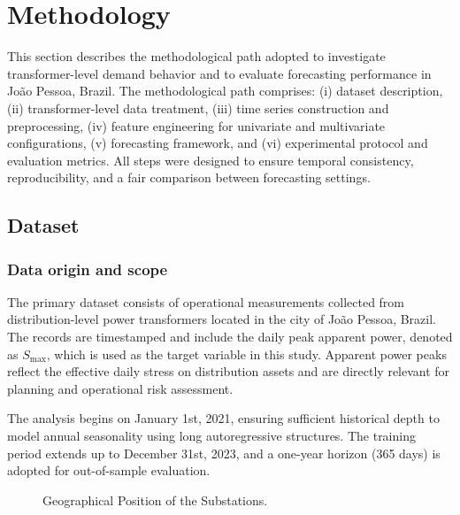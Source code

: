 \section{Methodology}
\label{sec:methodology}

This section describes the methodological path adopted to investigate transformer-level demand behavior and to evaluate forecasting performance in João Pessoa, Brazil. The methodological path comprises: (i) dataset description, (ii) transformer-level data treatment, (iii) time series construction and preprocessing, (iv) feature engineering for univariate and multivariate configurations, (v) forecasting framework, and (vi) experimental protocol and evaluation metrics. All steps were designed to ensure temporal consistency, reproducibility, and a fair comparison between forecasting settings.

\subsection{Dataset}
\label{subsec:dataset}

\subsubsection{Data origin and scope}
The primary dataset consists of operational measurements collected from distribution-level power transformers located in the city of João Pessoa, Brazil. The records are timestamped and include the daily peak apparent power, denoted as $S_{\max}$, which is used as the target variable in this study. Apparent power peaks reflect the effective daily stress on distribution assets and are directly relevant for planning and operational risk assessment.

The analysis begins on January 1st, 2021, ensuring sufficient historical depth to model annual seasonality using long autoregressive structures. The training period extends up to December 31st, 2023, and a one-year horizon (365 days) is adopted for out-of-sample evaluation.

\begin{figure}
    \centering
    
    \caption{Geographical Position of the Substations.}
    \label{fig:map_substations}
\end{figure}

